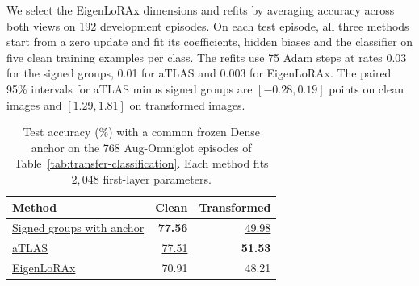 We select the EigenLoRAx dimensions and refits by averaging accuracy
across both views on 192 development episodes. On each test episode,
all three methods start from a zero update and fit its coefficients,
hidden biases and the classifier on five clean training examples per
class. The refits use 75 Adam steps at rates 0.03 for the signed groups, 0.01 for
aTLAS and 0.003 for EigenLoRAx. The paired 95\% intervals for aTLAS
minus signed groups are $[-0.28,0.19]$ points on clean images and $[1.29,1.81]$
on transformed images.

\begin{table}[htbp]
\centering\small
\caption{Test accuracy (\%) with a common frozen Dense anchor on
the 768 Aug-Omniglot episodes of
Table~\ref{tab:transfer-classification}. Each method fits
$2{,}048$ first-layer parameters.}
\label{tab:aug-omniglot-anchored}
\begin{tabular*}{\linewidth}{@{\extracolsep{\fill}}lrr@{}}
\toprule
Method & Clean & Transformed \\
\midrule
\hyperref[alg:signed-merge]{Signed groups with anchor} & \textbf{77.56} & \underline{49.98} \\
\href{https://arxiv.org/abs/2407.02880}{aTLAS}~\citep{zhang2024atlas} & \underline{77.51} & \textbf{51.53} \\
\href{https://arxiv.org/abs/2502.04700}{EigenLoRAx}~\citep{kaushik2025eigenlorax} & 70.91 & 48.21 \\
\bottomrule
\end{tabular*}
\end{table}
